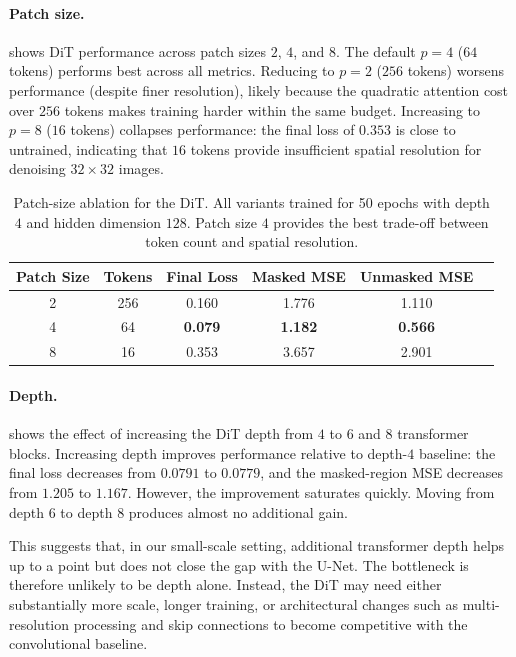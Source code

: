 \documentclass{article}
\begin{document}
\paragraph{Patch size.}
 shows DiT performance across patch sizes $2$, $4$, and $8$.
The default $p=4$ ($64$ tokens) performs best across all metrics.
Reducing to $p=2$ ($256$ tokens) worsens performance (despite finer resolution), likely because the quadratic attention cost over $256$ tokens makes training harder within the same budget.
Increasing to $p=8$ ($16$ tokens) collapses performance: the final loss of $0.353$ is close to untrained, indicating that $16$ tokens provide insufficient spatial resolution for denoising $32\times 32$ images.
\begin{table}[H]
    \caption{Patch-size ablation for the DiT. All variants trained for 50 epochs with depth $4$ and hidden dimension $128$. Patch size $4$ provides the best trade-off between token count and spatial resolution.}
    \label{tab:ablation-patch}
    \centering
    \begin{tabular}{cccccc}
    \toprule
    Patch Size & Tokens & Final Loss & Masked MSE & Unmasked MSE \\
    \midrule
    2 & 256 & 0.160 & 1.776 & 1.110 \\
    4 & 64 & \textbf{0.079} & \textbf{1.182} & \textbf{0.566} \\
    8 & 16 & 0.353 & 3.657 & 2.901 \\
    \bottomrule
    \end{tabular}
\end{table}

\paragraph{Depth.}

 shows the effect of increasing the DiT depth from $4$ to $6$ and $8$ transformer blocks.
Increasing depth improves performance relative to depth-$4$ baseline: the final loss decreases from $0.0791$ to $0.0779$, and the masked-region MSE decreases from $1.205$ to $1.167$.
However, the improvement saturates quickly.
Moving from depth $6$ to depth $8$ produces almost no additional gain.

This suggests that, in our small-scale setting, additional transformer depth helps up to a point but does not close the gap with the U-Net.
The bottleneck is therefore unlikely to be depth alone.
Instead, the DiT may need either substantially more scale, longer training, or architectural changes such as multi-resolution processing and skip connections to become competitive with the convolutional baseline.
\end{document}
